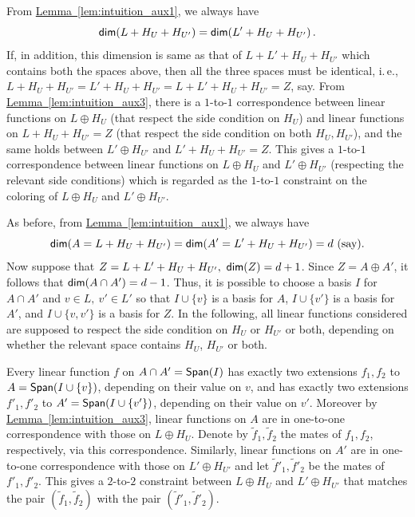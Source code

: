 \documentclass[11pt]{article}
\numberwithin{equation}{section}
\theoremstyle{definition}
\theoremstyle{plain}
\newcommand{\ie}{i.\,e.}
\newcommand{\expref}[2]{\hyperref[#2]{#1~\ref{#2}}}
\newcommand*\xor{\mathbin{\oplus}}
\begin{document}
\medskip {} From \expref{Lemma}{lem:intuition_aux1}, we always have
 $${\sf dim} (L + H_U + H_{U'}) = {\sf dim} (L' + H_U + H_{U'})\,.$$%
If, in addition, this dimension is same as that of $L + L' + H_U + H_{U'}$ which contains both the spaces above, then all the three spaces   must be identical, \ie,
$L + H_U + H_{U'} = L' + H_U + H_{U'} = L + L' + H_U + H_{U'} = Z$, say.
From \expref{Lemma}{lem:intuition_aux3}, there is a $1$-to-$1$ correspondence between linear functions on $L\xor H_U$
(that respect the side condition on $H_U$) and linear functions on $L+ H_U + H_{U'}=Z$  (that respect the side condition on both $H_U, H_{U'}$), and the same holds
between $L' \xor  H_{U'}$ and $L' + H_U + H_{U'} = Z$.
This gives a $1$-to-$1$ correspondence between linear functions on $L\xor H_U$ and $L'\xor H_{U'}$ (respecting the relevant side conditions)
which is regarded as the $1$-to-$1$ constraint on the
%
coloring  %
of $L\xor H_U$ and $L'\xor H_{U'}$.


\medskip {} As before,
from \expref{Lemma}{lem:intuition_aux1}, we always have
 $${\sf dim} (A = L + H_U + H_{U'}) = {\sf dim} (A' = L' + H_U + H_{U'}) = d ~\mbox{(say)}.$$
Now suppose that $Z = L + L' + H_U + H_{U'}, ~{\sf dim}(Z) = d+1$. Since $Z = A \xor A'$, it follows
that ${\sf dim}(A \cap A') = d-1$. Thus, it is possible to choose a basis $I$ for $A \cap A'$ and $v \in L, ~v' \in L'$
so that $I \cup \{ v \}$ is a basis for $A$,  $I \cup \{ v' \}$ is a  basis for $A'$, and $I \cup \{v, v'\}$ is a basis for $Z$. In the
following, all linear functions considered are supposed to respect the side condition on $H_U$ or $H_{U'}$ or both, depending on
whether the relevant space contains $H_U$, $H_{U'}$ or both.

Every linear function $f$ on $A \cap A' = {\sf Span}(I)$ has exactly two extensions $f_1, f_2$ to $A = {\sf Span}(I \cup \{v\})$,
depending on their value on $v$, and has exactly two extensions $f'_1, f'_2$ to $A' = {\sf Span}(I \cup \{v'\})$,
depending on their value on $v'$. Moreover by \expref{Lemma}{lem:intuition_aux3}, linear functions on $A$ are in one-to-one correspondence with
those on $L\xor H_U$.
Denote by $\tilde{f}_1, \tilde{f}_2$ the mates of $f_1, f_2$, respectively, via this correspondence.  %
Similarly, linear functions on $A'$ are in one-to-one correspondence with
those on $L'\xor H_{U'}$ and let $\tilde{f}'_1, \tilde{f}'_2$ be the mates of $f'_1, f'_2$. This gives a $2$-to-$2$ constraint
between $L\xor H_U$ and $L' \xor H_{U'}$ that matches the pair $(\tilde{f}_1, \tilde{f}_2)$ with the pair $(\tilde{f}'_1, \tilde{f}'_2)$.
\end{document}
